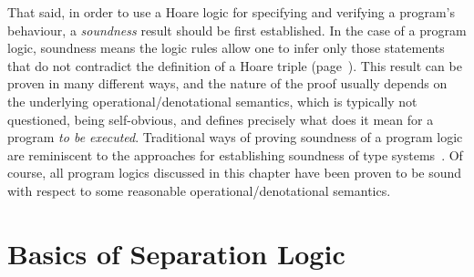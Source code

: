 That said, in order to use a Hoare logic for specifying and verifying
a program's behaviour, a \textit{soundness} result should be first
 established. In the case of a program
logic, soundness means the logic rules allow one to infer only those
statements that do not contradict the definition of a Hoare triple
(page~\pageref{pg:triple}). This result can be proven in many
different ways, and the nature of the proof usually depends on the
underlying operational/denotational semantics, which is typically not
questioned, being self-obvious, and defines precisely what does it
mean for a program \textit{to be executed}. Traditional ways of proving
soundness of a program logic are reminiscent to the approaches for
establishing soundness of type
systems~\cite{Pierce:BOOK02,Wright-Felleisen:IC94}. Of course, all
program logics discussed in this chapter have been proven to be sound
with respect to some reasonable operational/denotational semantics.


\section{Basics of Separation Logic}


